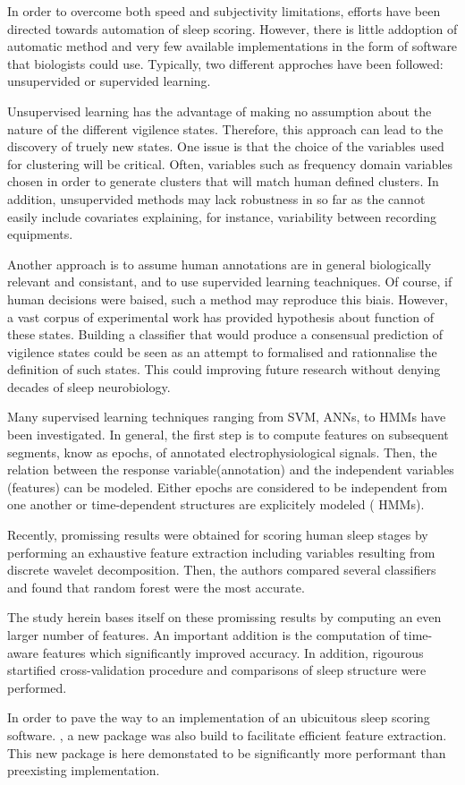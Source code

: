 In order to overcome both speed and subjectivity limitations, efforts have been directed towards automation of sleep scoring.
However, there is little addoption of automatic method and very few available implementations in the form of software that biologists could use.
Typically, two different approches have been followed: unsupervided or supervided learning.

Unsupervised learning has the advantage of making no assumption about the nature of the different vigilence states.
Therefore, this approach can lead to the discovery of truely new states.
One issue is that the choice of the variables used for clustering will be critical.
Often, variables such as frequency domain variables chosen in order to generate clusters that will match human defined clusters.
In addition, unsupervided methods may lack robustness in so far as the cannot easily include covariates explaining, for instance, variability between recording equipments.


Another approach is to assume human annotations are in general biologically relevant and consistant, and to use supervided learning teachniques.
Of course, if human decisions were baised, such a method may reproduce this biais.
However, a vast corpus of experimental work has provided hypothesis about function of these states.
Building a classifier that would produce a consensual prediction of vigilence states could be seen as an attempt to formalised and rationnalise the definition of such states.
This could improving future research without denying decades of sleep neurobiology. 

Many supervised learning techniques ranging from SVM, ANNs, to HMMs have been investigated.
In general, the first step is to compute features on subsequent segments, know as epochs, of annotated electrophysiological signals.
Then, the relation between the response variable(annotation) and the independent variables (features) can be modeled.
Either epochs are considered to be independent from one another or time-dependent structures are explicitely modeled (\eg{} HMMs).

Recently, promissing results were obtained for scoring human sleep stages by performing an exhaustive feature extraction including variables resulting from discrete wavelet decomposition.
Then, the authors compared several classifiers and found that random forest were the most accurate.

The study herein bases itself on these promissing results by computing an even larger number of features.
An important addition is the computation of time-aware features which significantly improved accuracy.
In addition, rigourous startified cross-validation procedure and comparisons of sleep structure were performed.

In order to pave the way to an implementation of an ubicuitous sleep scoring software.
\pr, a new \py{} package was also build to facilitate efficient feature extraction. 
This new package is here demonstated to be significantly more performant than preexisting implementation.

